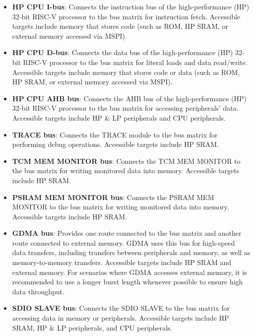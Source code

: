 \documentclass[main\_\_EN.tex]{subfiles}
\begin{document}
\begin{itemize}
    \item \textbf{HP CPU I-bus}: Connects the instruction bus of the high-performance (HP) 32-bit RISC-V processor to the bus matrix for instruction fetch. Accessible targets include memory that stores code (such as ROM, HP SRAM, or external memory accessed via MSPI).
    \item \textbf{HP CPU D-bus}: Connects the data bus of the high-performance (HP) 32-bit RISC-V processor to the bus matrix for literal loads and data read/write. Accessible targets include memory that stores code or data (such as ROM, HP SRAM, or external memory accessed via MSPI).
    \item \textbf{HP CPU AHB bus}: Connects the AHB bus of the high-performance (HP) 32-bit RISC-V processor to the bus matrix for accessing peripherals’ data. Accessible targets include HP \& LP peripherals and CPU peripherals.
    \item \textbf{TRACE bus}: Connects the TRACE module to the bus matrix for performing debug operations. Accessible targets include HP SRAM.
    \item \textbf{TCM MEM MONITOR bus}: Connects the TCM MEM MONITOR to the bus matrix for writing monitored data into memory. Accessible targets include HP SRAM.
    \item \textbf{PSRAM MEM MONITOR bus}: Connects the PSRAM MEM MONITOR to the bus matrix for writing monitored data into memory. Accessible targets include HP SRAM.
    \item \textbf{GDMA bus}: Provides one route connected to the bus matrix and another route connected to external memory. GDMA uses this bus for high-speed data transfers, including transfers between peripherals and memory, as well as memory-to-memory transfers. Accessible targets include HP SRAM and external memory. For scenarios where GDMA accesses external memory, it is recommended to use a longer burst length whenever possible to ensure high data throughput.
    \item \textbf{SDIO SLAVE bus}: Connects the SDIO SLAVE to the bus matrix for accessing data in memory or peripherals. Accessible targets include HP SRAM, HP \& LP peripherals, and CPU peripherals.
\end{itemize}
\end{document}
